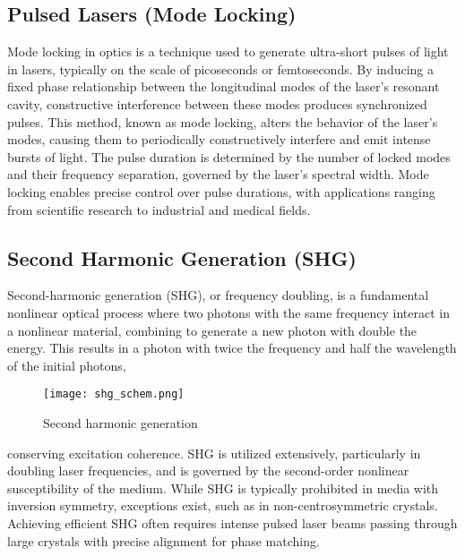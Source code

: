 \subsection{Pulsed Lasers (Mode Locking)}
    Mode locking in optics is a technique used to generate ultra-short pulses of light in lasers, typically on the scale of picoseconds or femtoseconds. 
    By inducing a fixed phase relationship between the longitudinal modes of the laser's resonant cavity, constructive interference between these modes produces synchronized pulses. 
    This method, known as mode locking, alters the behavior of the laser's modes, causing them to periodically constructively interfere and emit intense bursts of light. 
    The pulse duration is determined by the number of locked modes and their frequency separation, governed by the laser's spectral width. 
    Mode locking enables precise control over pulse durations, with applications ranging from scientific research to industrial and medical fields.

\subsection{Second Harmonic Generation (SHG)}
    Second-harmonic generation (SHG), or frequency doubling, is a fundamental nonlinear optical process where two photons with the same frequency interact in a nonlinear material, combining to generate a new photon with double the energy.
    This results in a photon with twice the frequency and half the wavelength of the initial photons,
    \begin{wrapfigure}[16]{r}[0cm]{0.4\textwidth}
        \centering
        \vspace{-\normalbaselineskip}
        \texttt{[image: shg\_schem.png]}
        \vspace{-10pt}
        \caption{Second harmonic generation }
        
        \label{fig:shg:basic}
    \end{wrapfigure}
    conserving excitation coherence. SHG is utilized extensively, particularly in doubling laser frequencies, and is governed by the second-order nonlinear susceptibility of the medium. 
    While SHG is typically prohibited in media with inversion symmetry, exceptions exist, such as in non-centrosymmetric crystals. 
    Achieving efficient SHG often requires intense pulsed laser beams passing through large crystals with precise alignment for phase matching.

